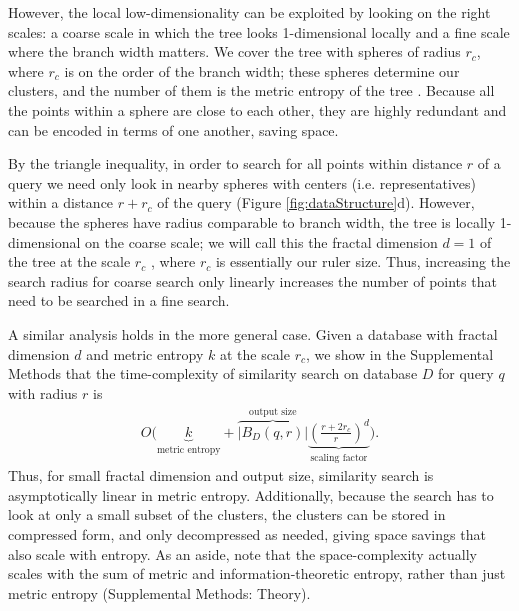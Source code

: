 \documentclass[review,preprint,12pt]{elsarticle}
\renewcommand{\cite}{\citep} %
\theoremstyle{definition}
\theoremstyle{remark}
\numberwithin{equation}{section}
\begin{document}
However, the local low-dimensionality can be exploited by looking on the right scales: a coarse scale in which the tree looks 1-dimensional locally and a fine scale where the branch width matters.
We cover the tree with spheres of radius $r_c$, where $r_c$ is on the order of the branch width; these spheres determine our clusters, and the number of them is the metric entropy of the tree \cite{tao2008product}.
Because all the points within a sphere are close to each other, they are highly 
redundant and can be encoded in terms of one another, saving space.

By the triangle inequality, in order to search for all points within distance $r$ of a query we need only look in nearby spheres with centers (i.e. representatives) within a distance $r+r_c$ of the query (Figure \ref{fig:dataStructure}d).
However, because the spheres have radius comparable to branch width, the tree is locally 1-dimensional on the coarse scale; we will call this the fractal dimension $d=1$ of the tree at the scale $r_c$ \cite{falconer1990fractal}, where $r_c$ is essentially our ruler size.
Thus, increasing the search radius for coarse search only linearly increases the number of points that need to be searched in a fine search.

A similar analysis holds in the more general case.
Given a database with fractal dimension $d$ and metric entropy $k$ at the scale $r_c$, we show in the Supplemental Methods that the time-complexity of similarity search on database $D$ for query $q$ with radius $r$ is
\begin{gather*}
    O\Bigg(
    \underbrace{k}_{\textrm{metric entropy}} +
    \overbrace{\left|B_D(q,r)\right|}^{\textrm{output size}}
    \underbrace{\left(\frac{r+2r_c}{r}\right)^d}_{\textrm{scaling factor}}
     \Bigg) .
\end{gather*}
Thus, for small fractal dimension and output size, similarity search is asymptotically linear in metric entropy.
Additionally, because the search has to look at only a small subset of the clusters, the clusters can be stored in compressed form, and only decompressed as needed, giving space savings that also scale with entropy.
As an aside, note that the space-complexity actually scales with the sum of metric and information-theoretic entropy, rather than just metric entropy 
(Supplemental Methods: Theory).
\end{document}
